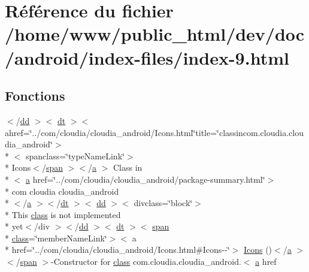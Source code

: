\hypertarget{index-9_8html}{\section{Référence du fichier /home/www/public\-\_\-html/dev/doc/android/index-\/files/index-\/9.html}
\label{index-9_8html}
}
\subsection*{Fonctions}
\begin{DoxyCompactItemize}
\item 
$<$/\hyperlink{stylesheet_8css_a47f4718a86835a7771ec592ece845221}{dd} $>$$<$ \hyperlink{stylesheet_8css_a107565fb4039d33b041380d6e0ea1d80}{dt} $>$$<$ ahref=\char`\"{}../com/cloudia/cloudia\-\_\-android/Icons.\-html\char`\"{}title=\char`\"{}classincom.\-cloudia.\-cloudia\-\_\-android\char`\"{}$>$\\*
$<$ spanclass=\char`\"{}type\-Name\-Link\char`\"{}$>$\\*
 Icons$<$/\hyperlink{stylesheet_8css_a8343996ebcf16220b04e54659aac31cc}{span} $>$$<$/\hyperlink{style_8css_a5e8981582017bb8b84c21f148345d1f7}{a} $>$ Class in\\*
$<$ \hyperlink{style_8css_a5e8981582017bb8b84c21f148345d1f7}{a} href=\char`\"{}../com/cloudia/cloudia\-\_\-android/package-\/summary.\-html\char`\"{}$>$\\*
 com cloudia cloudia\-\_\-android\\*
$<$/\hyperlink{style_8css_a5e8981582017bb8b84c21f148345d1f7}{a} $>$$<$/\hyperlink{stylesheet_8css_a107565fb4039d33b041380d6e0ea1d80}{dt} $>$$<$ \hyperlink{stylesheet_8css_a47f4718a86835a7771ec592ece845221}{dd} $>$$<$ divclass=\char`\"{}block\char`\"{}$>$\\*
 This \hyperlink{_tools_8html_acf06f836132665ba8114f5a414c2403f}{class} is not implemented \\*
yet$<$/div $>$$<$/\hyperlink{stylesheet_8css_a47f4718a86835a7771ec592ece845221}{dd} $>$$<$ \hyperlink{stylesheet_8css_a107565fb4039d33b041380d6e0ea1d80}{dt} $>$$<$ \hyperlink{stylesheet_8css_a8343996ebcf16220b04e54659aac31cc}{span} \\*
\hyperlink{_tools_8html_acf06f836132665ba8114f5a414c2403f}{class}=\char`\"{}member\-Name\-Link\char`\"{}$>$$<$ a \\*
href=\char`\"{}../com/cloudia/cloudia\-\_\-android/Icons.\-html\#Icons-\/-\/\char`\"{}$>$ \hyperlink{index-9_8html_ae2e09d799cc5b298a8938ac02dbc72de}{Icons} ()$<$/\hyperlink{style_8css_a5e8981582017bb8b84c21f148345d1f7}{a} $>$$<$/\hyperlink{stylesheet_8css_a8343996ebcf16220b04e54659aac31cc}{span} $>$-\/Constructor for \hyperlink{_tools_8html_acf06f836132665ba8114f5a414c2403f}{class} com.\-cloudia.\-cloudia\-\_\-android.$<$ \hyperlink{style_8css_a5e8981582017bb8b84c21f148345d1f7}{a} href
$$
\end{DoxyCompactItemize}
